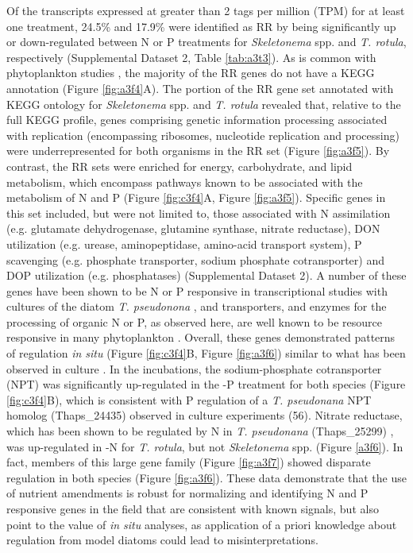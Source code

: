 Of the transcripts expressed at greater than 2 tags per million (TPM) for at least one treatment, 24.5\% and 17.9\% were identified as RR by being significantly up or down-regulated between N or P treatments for \textit{Skeletonema} spp. and \textit{T. rotula}, respectively (Supplemental Dataset 2, Table \ref{tab:a3t3}). As is common with phytoplankton studies \citep{Marchetti2012a}, the majority of the RR genes do not have a KEGG annotation (Figure \ref{fig:a3f4}A). The portion of the RR gene set annotated with KEGG ontology for \textit{Skeletonema} spp. and \textit{T. rotula} revealed that, relative to the full KEGG profile, genes comprising genetic information processing associated with replication (encompassing ribosomes, nucleotide replication and processing) were underrepresented for both organisms in the RR set (Figure \ref{fig:a3f5}). By contrast, the RR sets were enriched for energy, carbohydrate, and lipid metabolism, which encompass pathways known to be associated with the metabolism of N and P (Figure \ref{fig:c3f4}A, Figure \ref{fig:a3f5}). Specific genes in this set included, but were not limited to, those associated with N assimilation (e.g. glutamate dehydrogenase, glutamine synthase, nitrate reductase), DON utilization (e.g. urease, aminopeptidase, amino-acid transport system), P scavenging (e.g. phosphate transporter, sodium phosphate cotransporter) and DOP utilization (e.g. phosphatases) (Supplemental Dataset 2). A number of these genes have been shown to be N or P responsive in transcriptional studies with cultures of the diatom \textit{T. pseudonona} \citep{Dyhrman2012, Bender2014}, and transporters, and enzymes for the processing of organic N or P, as observed here, are well known to be resource responsive in many phytoplankton \citep{Dyhrman2012, Wurch2011, Dyhrman2006, Bruhn2010}. Overall, these genes demonstrated patterns of regulation \textit{in situ} (Figure \ref{fig:c3f4}B, Figure \ref{fig:a3f6}) similar to what has been observed in culture \citep{Dyhrman2012, Bender2014}. In the incubations, the sodium-phosphate cotransporter (NPT) was significantly up-regulated in the -P treatment for both species (Figure \ref{fig:c3f4}B), which is consistent with P regulation of a \textit{T. pseudonana} NPT homolog (Thaps\_24435) observed in culture experiments (56). Nitrate reductase, which has been shown to be regulated by N in \textit{T. pseudonana} (Thaps\_25299) \citep{Bender2012}, was up-regulated in -N for \textit{T. rotula}, but not \textit{Skeletonema} spp. (Figure \ref{a3f6}). In fact, members of this large gene family (Figure \ref{fig:a3f7}) showed disparate regulation in both species (Figure \ref{fig:a3f6}).  These data demonstrate that the use of nutrient amendments is robust for normalizing and identifying N and P responsive genes in the field that are consistent with known signals, but also point to the value of \textit{in situ} analyses, as application of a priori knowledge about regulation from model diatoms could lead to misinterpretations.\par


